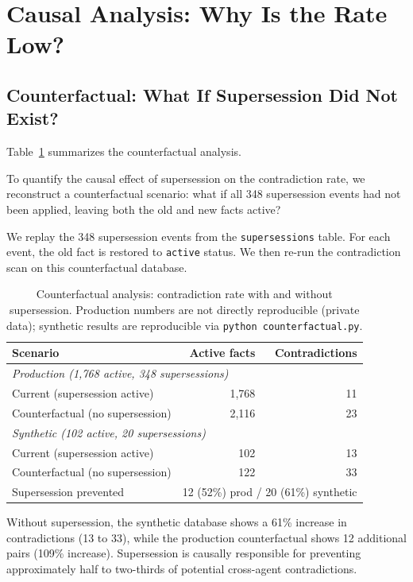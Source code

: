 \documentclass{article}
\begin{document}
\label{sec:production}
\section{Causal Analysis: Why Is the Rate Low?}
\label{sec:causal}

\subsection{Counterfactual: What If Supersession Did Not Exist?}

Table~\ref{tab:counterfactual} summarizes the counterfactual analysis.


To quantify the causal effect of supersession on the contradiction rate, we reconstruct a counterfactual scenario: what if all 348 supersession events had not been applied, leaving both the old and new facts active?

We replay the 348 supersession events from the \texttt{supersessions} table. For each event, the old fact is restored to \texttt{active} status. We then re-run the contradiction scan on this counterfactual database.

\begin{table}[h]
\centering
\caption{Counterfactual analysis: contradiction rate with and without supersession. Production numbers are not directly reproducible (private data); synthetic results are reproducible via \texttt{python counterfactual.py}.}
\begin{tabular}{lrr}
\toprule
Scenario & Active facts & Contradictions \\
\midrule
\multicolumn{3}{l}{\emph{Production (1{,}768 active, 348 supersessions)}} \\
Current (supersession active) & 1{,}768 & 11 \\
Counterfactual (no supersession) & 2{,}116 & 23 \\
\midrule
\multicolumn{3}{l}{\emph{Synthetic (102 active, 20 supersessions)}} \\
Current (supersession active) & 102 & 13 \\
Counterfactual (no supersession) & 122 & 33 \\
\midrule
Supersession prevented & \multicolumn{2}{l}{12 (52\%) prod / 20 (61\%) synthetic} \\
\bottomrule
\end{tabular}
\label{tab:counterfactual}
\end{table}

Without supersession, the synthetic database shows a 61\% increase in contradictions (13 to 33), while the production counterfactual shows 12 additional pairs (109\% increase). Supersession is causally responsible for preventing approximately half to two-thirds of potential cross-agent contradictions.
\end{document}
